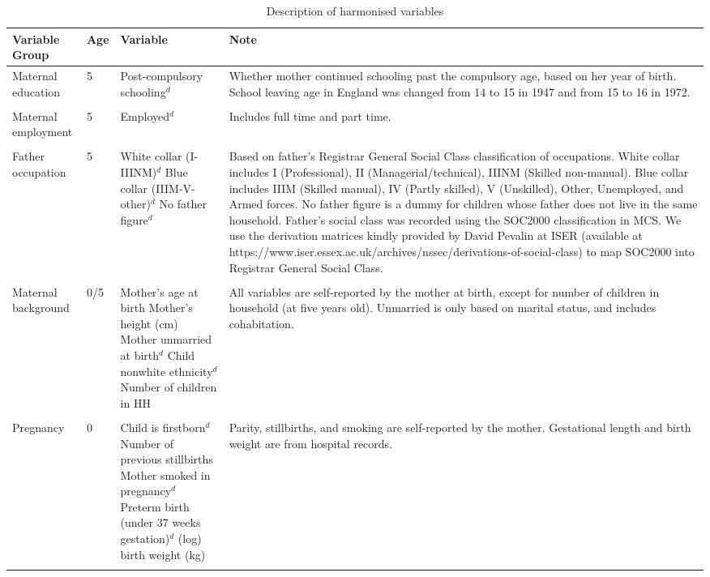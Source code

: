 
\begin{sidewaystable}[ht!]
\caption{Description of harmonised variables}\label{tab:harmvar}
\centering{} \scriptsize
\begin{tabular}{L{.15\textwidth}C{.08\textwidth}L{.22\textwidth}L{.55\textwidth}}
\toprule
Variable Group & Age & Variable & Note \\
\midrule
Maternal education & 5 & Post-compulsory schooling$^d$ & Whether mother continued schooling past the compulsory age, based on her year of birth. School leaving age in England was changed from 14 to 15 in 1947 and from 15 to 16 in 1972. \\ \\[-1.5em]
Maternal employment & 5 & Employed$^d$ & Includes full time and part time. \\ \\[-1.5em]
Father occupation & 5 & White collar (I-IIINM)$^d$ \newline Blue collar (IIIM-V-other)$^d$ \newline No father figure$^d$ & Based on father's Registrar General Social Class classification of occupations. White collar includes I (Professional), II (Managerial/technical), IIINM (Skilled non-manual). Blue collar includes IIIM (Skilled manual), IV (Partly skilled), V (Unskilled), Other, Unemployed, and Armed forces. No father figure is a dummy for children whose father does not live in the same household. Father's social class was recorded using the SOC2000 classification in MCS. We use the derivation matrices kindly provided by David Pevalin at ISER (available at https://www.iser.essex.ac.uk/archives/nssec/derivations-of-social-class) to map SOC2000 into Registrar General Social Class. \\ \\[-1.5em]
Maternal background & 0/5 & Mother's age at birth \newline Mother's height (cm) \newline Mother unmarried at birth$^d$ \newline Child nonwhite ethnicity$^d$  \newline Number of children in HH & All variables are self-reported by the mother at birth, except for number of children in household (at five years old). Unmarried is only based on marital status, and includes cohabitation. \\ \\[-1.5em]
Pregnancy & 0 & Child is firstborn$^d$ \newline Number of previous stillbirths \newline Mother smoked in pregnancy$^d$ \newline Preterm birth (under 37 weeks gestation)$^d$ \newline (log) birth weight (kg) & Parity, stillbirths, and smoking are self-reported by the mother. Gestational length and birth weight are from hospital records. \\ \\[-1.5em]

\end{tabular}
\end{sidewaystable}
